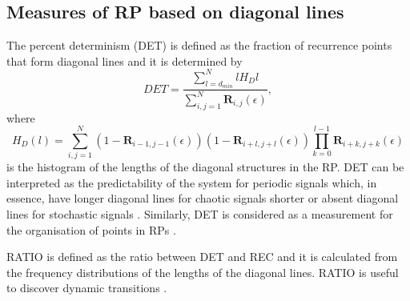 \subsection{Measures of RP based on diagonal lines}
The percent determinism (DET) is defined as the fraction of recurrence points
that form diagonal lines and it is determined by
\begin{equation}
	DET=\frac{\sum^{N}_{l=d_{min}} l H_D{l} }{\sum^{N}_{i,j=1} 
	\mathbf{R}_{i,j}(\epsilon) },
\end{equation}
where 
\begin{equation}
	H_D(l) = \sum^{N}_{i,j=1} (1- \mathbf{R}_{i-1,j-1}(\epsilon) ) 
		(1- \mathbf{R}_{i+l,j+l}(\epsilon) ) 
		\prod^{l-1}_{k=0}  \mathbf{R}_{i+k,j+k}(\epsilon)
\end{equation}
is the histogram of the lengths of the diagonal structures in the RP.
DET can be interpreted as the predictability of the system for periodic 
signals which, in essence, have longer diagonal lines for chaotic signals 
shorter or absent diagonal lines for stochastic signals \citep{marwan2007, 
marwan2015}. Similarly, DET is considered as a measurement for 
the organisation of points in RPs \citep{iwanski1998}. 


RATIO is defined as the ratio between DET and REC and it is calculated from 
the frequency distributions of the lengths of the diagonal lines.
RATIO is useful to discover dynamic transitions \citep{marwan2015}.
% 
%
%

